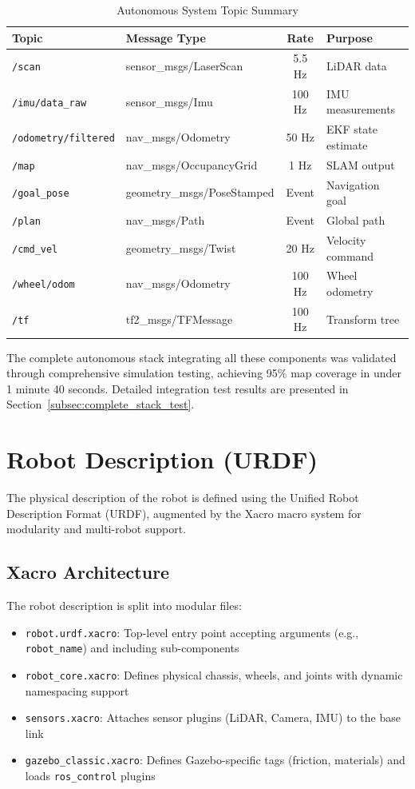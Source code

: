 \begin{table}[H]
\centering
\caption{Autonomous System Topic Summary}
\label{tab:topic_summary}
\begin{tabular}{|l|l|c|l|}
\hline
\textbf{Topic} & \textbf{Message Type} & \textbf{Rate} & \textbf{Purpose} \\
\hline
\texttt{/scan} & sensor\_msgs/LaserScan & 5.5 Hz & LiDAR data \\
\texttt{/imu/data\_raw} & sensor\_msgs/Imu & 100 Hz & IMU measurements \\
\texttt{/odometry/filtered} & nav\_msgs/Odometry & 50 Hz & EKF state estimate \\
\texttt{/map} & nav\_msgs/OccupancyGrid & 1 Hz & SLAM output \\
\texttt{/goal\_pose} & geometry\_msgs/PoseStamped & Event & Navigation goal \\
\texttt{/plan} & nav\_msgs/Path & Event & Global path \\
\texttt{/cmd\_vel} & geometry\_msgs/Twist & 20 Hz & Velocity command \\
\texttt{/wheel/odom} & nav\_msgs/Odometry & 100 Hz & Wheel odometry \\
\texttt{/tf} & tf2\_msgs/TFMessage & 100 Hz & Transform tree \\
\hline
\end{tabular}
\end{table}

The complete autonomous stack integrating all these components was validated through comprehensive simulation testing, achieving 95\% map coverage in under 1 minute 40 seconds. Detailed integration test results are presented in Section~\ref{subsec:complete_stack_test}.

\section{Robot Description (URDF)}
\label{sec:urdf}

The physical description of the robot is defined using the Unified Robot Description Format (URDF), augmented by the Xacro macro system for modularity and multi-robot support.

\subsection{Xacro Architecture}

The robot description is split into modular files:
\begin{itemize}
    \item \texttt{robot.urdf.xacro}: Top-level entry point accepting arguments (e.g., \texttt{robot\_name}) and including sub-components
    \item \texttt{robot\_core.xacro}: Defines physical chassis, wheels, and joints with dynamic namespacing support
    \item \texttt{sensors.xacro}: Attaches sensor plugins (LiDAR, Camera, IMU) to the base link
    \item \texttt{gazebo\_classic.xacro}: Defines Gazebo-specific tags (friction, materials) and loads \texttt{ros\_control} plugins
\end{itemize}


